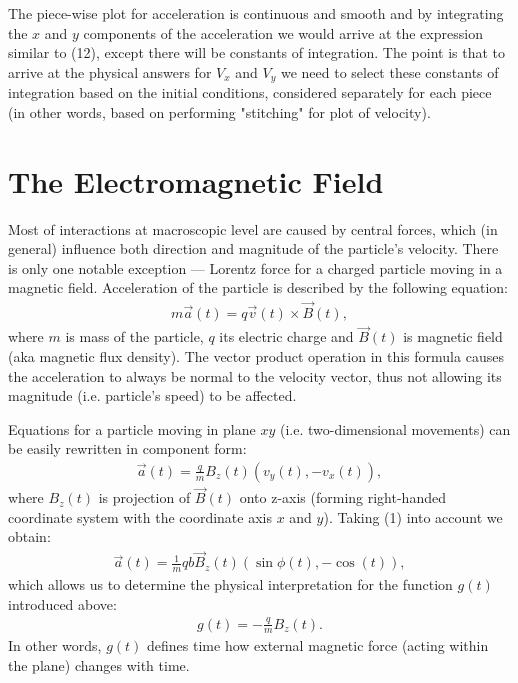 \documentclass[journal]{IEEEtran}
\begin{document}
The piece-wise plot for acceleration is continuous and smooth and by integrating the $x$ and $y$ components of the acceleration we would arrive at the expression similar to (12), except there will be constants of integration. The point is that to arrive at the physical answers for $V_x$ and $V_y$ we need to select these constants of integration based on the initial conditions, considered separately for each piece (in other words, based on performing "stitching" for plot of velocity). 






\section{\bf\large The Electromagnetic Field}

Most of interactions at macroscopic level are caused by central forces, which (in general) influence both direction and magnitude of the particle's velocity. There is only one notable exception --- Lorentz force for a charged particle moving in a magnetic field. Acceleration of the particle is described by the following equation:
\begin{align}
m \vec{a}(t)= q \vec{v}(t) \times \vec{B}(t),
\end{align}
where $m$ is mass of the particle, $q$ its electric charge and $\vec{B}(t)$ is magnetic field (aka magnetic flux density). The vector product operation in this formula causes the acceleration to always be normal to the velocity vector, thus not allowing its magnitude (i.e. particle's speed) to be affected.

Equations for a particle moving in plane $xy$ (i.e. two-dimensional movements) can be easily rewritten in component form:
\begin{align}
\vec{a}(t)= \frac{q}{m} B_z(t)( v_y(t), - v_x(t)), 
\end{align}
where $B_z(t)$ is projection of $\vec{B}(t)$ onto z-axis (forming right-handed coordinate system with the coordinate axis $x$ and $y$). Taking (1) into account we obtain:
\begin{align}
\vec{a}(t)= \frac{1}{m} q b \vec{B}_z(t) ( \sin \phi (t), - \cos (t) ), 
\end{align}
which allows us to determine the physical interpretation for the function $g(t)$ introduced above: 
\begin{align}
g(t)= - \frac{q}{m} B_z(t).
\end{align}
In other words, $g(t)$ defines time how external magnetic force (acting within the plane) changes with time.
\end{document}
